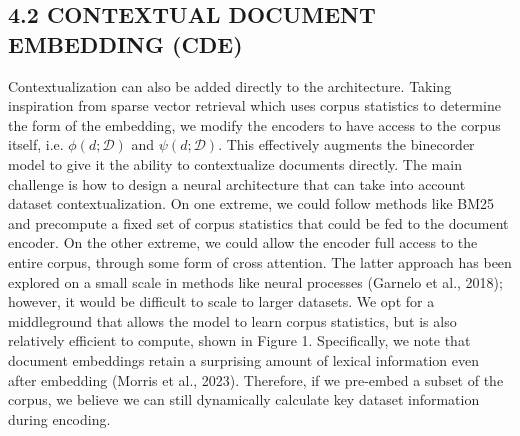 \subsection*{4.2 CONTEXTUAL DOCUMENT EMBEDDING (CDE)}
Contextualization can also be added directly to the architecture. Taking inspiration from sparse vector retrieval which uses corpus statistics to determine the form of the embedding, we modify the encoders to have access to the corpus itself, i.e. \(\phi(d ; \mathcal{D})\) and \(\psi(d ; \mathcal{D})\). This effectively augments the binecorder model to give it the ability to contextualize documents directly.
The main challenge is how to design a neural architecture that can take into account dataset contextualization. On one extreme, we could follow methods like BM25 and precompute a fixed set of corpus statistics that could be fed to the document encoder. On the other extreme, we could allow the encoder full access to the entire corpus, through some form of cross attention. The latter approach has been explored on a small scale in methods like neural processes (Garnelo et al., 2018); however, it would be difficult to scale to larger datasets.
We opt for a middleground that allows the model to learn corpus statistics, but is also relatively efficient to compute, shown in Figure 1. Specifically, we note that document embeddings retain a surprising amount of lexical information even after embedding (Morris et al., 2023). Therefore, if we pre-embed a subset of the corpus, we believe we can still dynamically calculate key dataset information during encoding.


